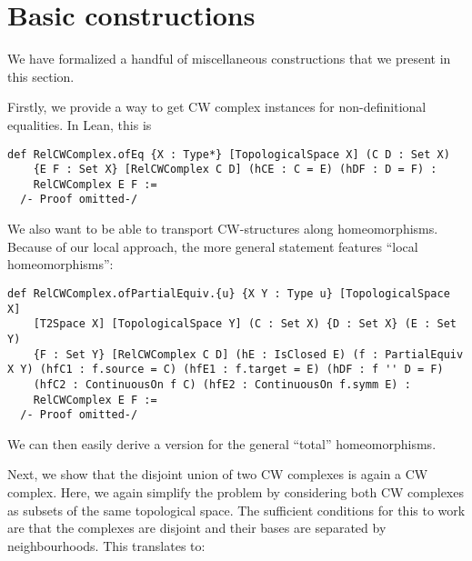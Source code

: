\section{Basic constructions}


We have formalized a handful of miscellaneous constructions that we present in this section.

Firstly, we provide a way to get CW complex instances for non-definitional equalities. 
In Lean, this is 

\begin{lstlisting}[frame=single]
def RelCWComplex.ofEq {X : Type*} [TopologicalSpace X] (C D : Set X)
    {E F : Set X} [RelCWComplex C D] (hCE : C = E) (hDF : D = F) : 
    RelCWComplex E F :=
  /- Proof omitted-/
\end{lstlisting}

We also want to be able to transport CW-structures along homeomorphisms. 
Because of our local approach, the more general statement features ``local homeomorphisms'': 

\begin{lstlisting}[frame=single]
def RelCWComplex.ofPartialEquiv.{u} {X Y : Type u} [TopologicalSpace X] 
    [T2Space X] [TopologicalSpace Y] (C : Set X) {D : Set X} (E : Set Y) 
    {F : Set Y} [RelCWComplex C D] (hE : IsClosed E) (f : PartialEquiv X Y) (hfC1 : f.source = C) (hfE1 : f.target = E) (hDF : f '' D = F) 
    (hfC2 : ContinuousOn f C) (hfE2 : ContinuousOn f.symm E) :
    RelCWComplex E F := 
  /- Proof omitted-/
\end{lstlisting}

We can then easily derive a version for the general ``total'' homeomorphisms.

Next, we show that the disjoint union of two CW complexes is again a CW complex. 
Here, we again simplify the problem by considering both CW complexes as subsets of the same topological space. 
The sufficient conditions for this to work are that the complexes are disjoint and their bases are separated by neighbourhoods. 
This translates to: 

